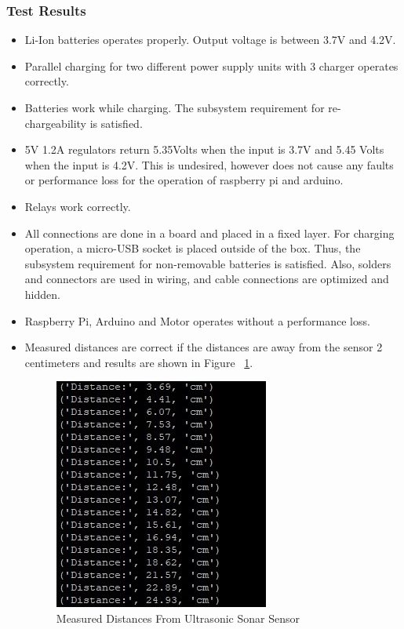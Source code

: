 \subsubsection{Test Results} 
\begin{itemize}
\item Li-Ion batteries operates properly. Output voltage is between 3.7V and 4.2V.
\item Parallel charging for two different power supply units with 3 charger operates correctly.
\item Batteries work while charging. The subsystem requirement for re-chargeability is satisfied. 
\item 5V 1.2A regulators return 5.35Volts when the  input is 3.7V  and 5.45 Volts when the input is 4.2V.  This is undesired, however does not cause any faults or performance loss for the operation of raspberry pi and arduino.
\item Relays work correctly.
\item All connections are done in a board and placed in a fixed layer. For charging operation, a micro-USB socket is placed outside of the box. Thus, the subsystem requirement for non-removable batteries is satisfied. Also, solders and connectors are used in wiring, and cable connections are optimized and hidden.
\item Raspberry Pi, Arduino and Motor operates without a performance loss.
\item Measured distances are correct if the distances are away from the sensor 2 centimeters and results are shown in Figure ~\ref{fig:sonardist}.

\begin{figure}[h!]
     \centering
     \includegraphics[width=0.45\linewidth]{content/050_electrical_design/sonardistance-1.jpg}
     \caption{ Measured Distances From Ultrasonic Sonar Sensor}
     \label{fig:sonardist}
\end{figure}




\end{itemize}
